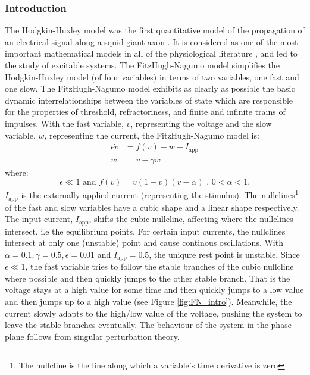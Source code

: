 \documentclass[a4paper, 12pt]{article}
\begin{document}
\subsubsection{Introduction}
The Hodgkin-Huxley model\cite{huxley} was the first quantitative model of the propagation of an electrical signal along a squid giant axon \cite{keener}. It is considered as one of the most important mathematical models in all of the physiological literature \cite{keener}, and led to the study of excitable systems.  The FitzHugh-Nagumo model simplifies the Hodgkin-Huxley model (of four variables) in terms of two variables, one fast and one slow. The FitzHugh-Nagumo model exhibits as clearly as possible the basic dynamic interrelationships between the variables of state which are responsible for the properties of threshold, refractoriness, and finite and infinite trains of impulses\cite{fitzhugh}.  With the fast variable, $v$, representing the voltage and the slow variable, $w$, representing the current, the FitzHugh-Nagumo model is:
\begin{align}
\epsilon\dot{v} &= f(v) - w + I_\text{app}\\
\dot{w} &= v - \gamma w
\end{align}
where: 
\begin{equation*}
\epsilon \ll 1 \text{  and  } f(v) = v(1-v)(v-\alpha) \text{ , } 0 <\alpha<1 .
\end{equation*} 
$I_\text{app}$ is the externally applied current (representing the stimulus). The nullclines\footnote{The nullcline is the line along which a variable's time derivative is zero} of the fast and slow variables have a cubic shape and a linear shape respectively.   The input current, $I_\text{app}$, shifts the cubic nullcline, affecting where the nullclines intersect, i.e the equilibrium points. For certain input currents, the nullclines intersect at only one (unstable) point and cause continous oscillations. With $\alpha =0.1, \gamma = 0.5, \epsilon = 0.01$ and $I_{\text{app}}=0.5$, the uniqure rest point is unstable. Since $\epsilon \ll 1 $, the fast variable tries to follow the stable branches of the cubic nullcline where possible and then quickly jumps to the other stable branch. That is the voltage stays at a high value for some time and then quickly jumps to a low value and then jumps up to a high value (see Figure \ref{fig:FN_intro}).  Meanwhile, the current slowly adapts to the high/low value of the voltage, pushing the system to leave the stable branches eventually. The behaviour of the system in the phase plane follows from singular perturbation theory\cite{keener}. 
\end{document}
